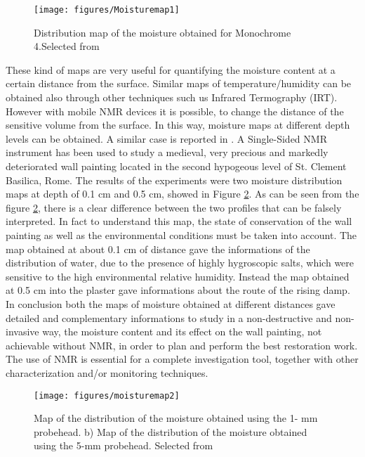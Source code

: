 \documentclass[a4paper,11pt]{report}
\begin{document}
\begin{figure}[h]
	\centering
	\texttt{[image: figures/Moisturemap1]}
	\caption{Distribution map of the moisture obtained for Monochrome 4.Selected from \cite{trefresco} }\label{moisturemap1}
\end{figure}
These kind of maps are very useful for quantifying the moisture content at a certain distance from the surface. Similar maps of temperature/humidity can be obtained also through other techniques such us Infrared Termography (IRT). However with mobile NMR devices it is possible, to change the distance of the sensitive volume from the surface. In this way, moisture maps at different depth levels can be obtained. A similar case is reported in \cite{quattrofresco}. A Single-Sided NMR instrument has been used to  study a medieval, very precious and markedly deteriorated wall painting located in the second hypogeous level of St. Clement Basilica, Rome. The results of the experiments were two moisture distribution maps at depth of 0.1 cm and 0.5 cm, showed in Figure \ref{moisturemap2}. As can be seen from the figure \ref{moisturemap2}, there is a clear difference between the two profiles that can be falsely interpreted. In fact to understand this map, the state of conservation of the wall painting as well as the environmental conditions must be taken into account. The map obtained at about 0.1 cm of distance gave the informations of the distribution of water, due to the presence of highly hygroscopic salts, which were sensitive to the high environmental relative humidity. Instead the map obtained at 0.5 cm into the plaster gave informations about the route of the rising damp.
   In conclusion both the maps of moisture obtained at different distances gave detailed and complementary informations to study in a non-destructive and non-invasive way, the moisture content and its effect on the wall painting, not achievable without NMR, in order to  plan and perform the best restoration work. The use of NMR is essential for a complete investigation tool, together with other characterization and/or monitoring techniques.


\begin{figure}[h]
	\centering
	\texttt{[image: figures/moisturemap2]}
	\caption{Map of the distribution of the moisture obtained using the 1- mm probehead. b) Map of the distribution of the moisture obtained using the 5-mm probehead. 
Selected from \cite{quattrofresco}} \label{moisturemap2}
\end{figure}
 
\end{document}

